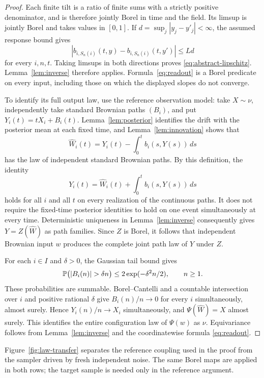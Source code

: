 \begin{proof}
Each finite tilt is a ratio of finite sums with a strictly positive
denominator, and is therefore jointly Borel in time and the field.
Its limsup is jointly Borel and takes values in $[0,1]$.
If $d=\sup_j|y_j-y'_j|<\infty$, the assumed response bound gives
\[
 |b_{i,S_n(i)}(t,y)-b_{i,S_n(i)}(t,y')|\le Ld
\]
for every $i,n,t$.  Taking limsups in both directions proves
\eqref{eq:abstract-lipschitz}.  Lemma~\ref{lem:inverse} therefore
applies.  Formula~\eqref{eq:readout} is a Borel predicate on every
input, including those on which the displayed slopes do not converge.

To identify its full output law, use the reference observation model:
take $X\sim\nu$, independently take standard Brownian paths $(B_i)$,
and put $Y_i(t)=tX_i+B_i(t)$.  Lemma~\ref{lem:posterior} identifies
the drift with the posterior mean at each fixed time, and
Lemma~\ref{lem:innovation} shows that
\[
 \widehat W_i(t)=Y_i(t)-\int_0^t b_i(s,Y(s))\,ds
\]
has the law of independent standard Brownian paths.
By this definition, the identity
\[
 Y_i(t)=\widehat W_i(t)+\int_0^t b_i(s,Y(s))\,ds
\]
holds for all $i$ and all $t$ on every realization of the continuous
paths.  It does not require the fixed-time posterior identities to
hold on one event simultaneously at every time.
Deterministic uniqueness in Lemma~\ref{lem:inverse} consequently gives
$Y=Z(\widehat W)$ as path families.  Since $Z$ is Borel, it follows
that independent Brownian input $w$ produces the complete joint path
law of $Y$ under $Z$.

For each $i\in I$ and $\delta>0$, the Gaussian tail bound gives
\[
 \P\bigl(|B_i(n)|>\delta n\bigr)
 \le 2\exp(-\delta^2n/2),\qquad n\ge1.
\]
These probabilities are summable.  Borel--Cantelli and a countable
intersection over $i$ and positive rational $\delta$ give
$B_i(n)/n\to0$ for every $i$ simultaneously, almost surely.
Hence $Y_i(n)/n\to X_i$ simultaneously, and
$\Psi(\widehat W)=X$ almost surely.  This identifies the entire
configuration law of $\Psi(w)$ as $\nu$.  Equivariance follows from
Lemma~\ref{lem:inverse} and the coordinatewise formula
\eqref{eq:readout}.
\end{proof}

Figure~\ref{fig:law-transfer} separates the reference coupling used in the
proof from the sampler driven by fresh independent noise. The same Borel
maps are applied in both rows; the target sample is needed only in the
reference argument.

